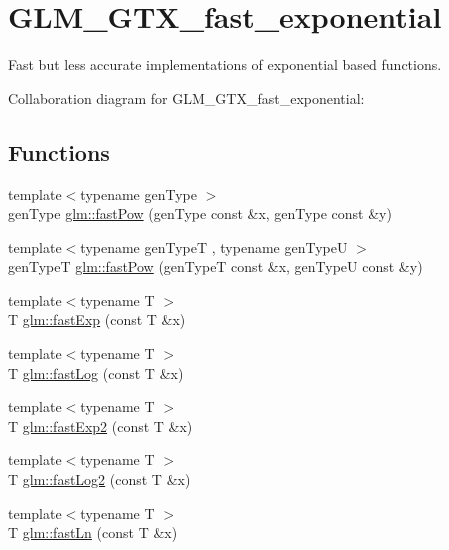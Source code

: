 \hypertarget{group__gtx__fast__exponential}{}\section{G\+L\+M\+\_\+\+G\+T\+X\+\_\+fast\+\_\+exponential}
\label{group__gtx__fast__exponential}


Fast but less accurate implementations of exponential based functions.  


Collaboration diagram for G\+L\+M\+\_\+\+G\+T\+X\+\_\+fast\+\_\+exponential\+:
\subsection*{Functions}
\begin{DoxyCompactItemize}
\item 
{\footnotesize template$<$typename gen\+Type $>$ }\\gen\+Type \hyperlink{group__gtx__fast__exponential_ga0ecbe429c87b820368f425ee8d22841a}{glm\+::fast\+Pow} (gen\+Type const \&x, gen\+Type const \&y)
\item 
{\footnotesize template$<$typename gen\+Type\+T , typename gen\+Type\+U $>$ }\\gen\+Type\+T \hyperlink{group__gtx__fast__exponential_ga3afd7b7f1ac505ca9247dc6ffa0c25cb}{glm\+::fast\+Pow} (gen\+Type\+T const \&x, gen\+Type\+U const \&y)
\item 
{\footnotesize template$<$typename T $>$ }\\T \hyperlink{group__gtx__fast__exponential_ga81550f837781889cc21fe49852102ea0}{glm\+::fast\+Exp} (const T \&x)
\item 
{\footnotesize template$<$typename T $>$ }\\T \hyperlink{group__gtx__fast__exponential_ga784a80d571f0f596d438863775827cd0}{glm\+::fast\+Log} (const T \&x)
\item 
{\footnotesize template$<$typename T $>$ }\\T \hyperlink{group__gtx__fast__exponential_ga27ffd3d58db8a5309300f16cc5d9284c}{glm\+::fast\+Exp2} (const T \&x)
\item 
{\footnotesize template$<$typename T $>$ }\\T \hyperlink{group__gtx__fast__exponential_gac516a11818384b9392412ac199044cf6}{glm\+::fast\+Log2} (const T \&x)
\item 
{\footnotesize template$<$typename T $>$ }\\T \hyperlink{group__gtx__fast__exponential_gaddd4e635f1c3168122fe7b14753935b9}{glm\+::fast\+Ln} (const T \&x)
\end{DoxyCompactItemize}


